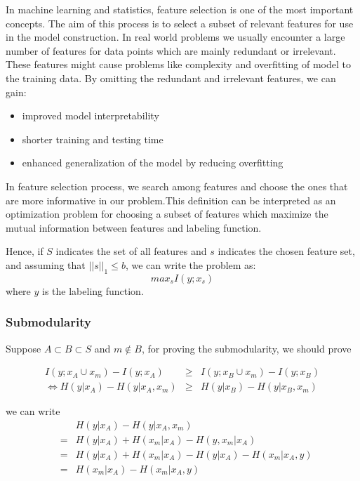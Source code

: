 In machine learning and statistics, feature selection is one of the most important concepts. The aim of this process is to select a subset of relevant features for use in the model construction.  In real world problems we usually encounter a large number of features for data points which are mainly redundant or irrelevant. These features might cause problems like complexity  and overfitting of model to the training data. By omitting the redundant and irrelevant features, we can gain:
\begin{itemize}
\item improved model interpretability
\item shorter training and testing time
\item enhanced generalization of the model by reducing overfitting
\end{itemize} 

In feature selection process, we  search among features and choose the ones that are more informative in our problem.This definition  can be interpreted as an optimization problem for choosing a subset of features which maximize the mutual information between features and labeling function.

Hence, if $S$ indicates the set of all features and $s$ indicates the chosen feature set, and assuming that $||s||_1\leq b$, we can write the problem as:
\begin{equation*}
max_s I(y;x_s)
\end{equation*} 
where $y$ is the labeling function.

\subsubsection{Submodularity}

Suppose $A \subset B \subset S$ and $m \not \in B$, for proving the submodularity, we should prove

\begin{eqnarray}
I(y;x_A \cup x_m) - I(y;x_A) &\geq & I(y;x_B \cup x_m) - I(y;x_B) \nonumber \\
\Leftrightarrow H(y|x_A)-H(y|x_A,x_m) &\geq & H(y|x_B)-H(y|x_B,x_m) \label{f1}
\end{eqnarray}
  
 we can write
\begin{eqnarray} 
	&&H(y|x_A)-H(y|x_A,x_m) \nonumber \\
	&=&H(y|x_A)+ H(x_m|x_A)-H(y,x_m|x_A)\nonumber \\
	&=&H(y|x_A)+ H(x_m|x_A) -H(y|x_A) - H(x_m|x_A,y)\nonumber \\
	&=& H(x_m|x_A)- H(x_m|x_A,y) \label{f2}
\end{eqnarray} 

